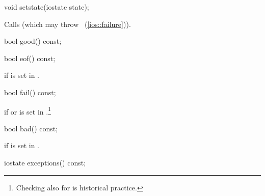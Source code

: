 %
\begin{itemdecl}
void setstate(iostate state);
\end{itemdecl}

\begin{itemdescr}
\pnum
\effects
Calls
(which may throw
~(\ref{ios::failure})).
\end{itemdescr}

%
\begin{itemdecl}
bool good() const;
\end{itemdecl}

\begin{itemdescr}
\pnum
\returns
{}
\end{itemdescr}

%
\begin{itemdecl}
bool eof() const;
\end{itemdecl}

\begin{itemdescr}
\pnum
\returns
{}
if
is set in
.
\end{itemdescr}

%
\begin{itemdecl}
bool fail() const;
\end{itemdecl}

\begin{itemdescr}
\pnum
\returns
{}
if
or
is set in
.\footnote{Checking
also for
is historical practice.}
\end{itemdescr}

%
\begin{itemdecl}
bool bad() const;
\end{itemdecl}

\begin{itemdescr}
\pnum
\returns
{}
if
is set in
.
\end{itemdescr}

%
\begin{itemdecl}
iostate exceptions() const;
\end{itemdecl}

